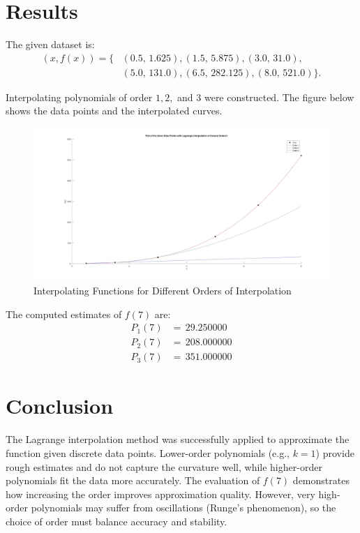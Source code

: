 \section*{Results}
The given dataset is:
\[
\begin{aligned}
(x, f(x)) = \{ &(0.5,\, 1.625), (1.5,\, 5.875), (3.0,\, 31.0), \\
               &(5.0,\, 131.0), (6.5,\, 282.125), (8.0,\, 521.0) \}.
\end{aligned}
\]

Interpolating polynomials of order $1, 2,$ and $3$ were constructed. The figure below shows the data points and the interpolated curves.

\begin{figure}[h!]
  \centering
  \includegraphics[width=1.0\textwidth]{a1.jpg}
  \caption{Interpolating Functions for Different Orders of Interpolation}
  \label{fig:a1}
\end{figure}

The computed estimates of $f(7)$ are:
\[
\begin{aligned}
  P_1(7) &= \, 29.250000 \\
  P_2(7) &= \, 208.000000 \\
  P_3(7) &= \, 351.000000
\end{aligned}
\]

\section*{Conclusion}
The Lagrange interpolation method was successfully applied to approximate the function given discrete data points. Lower-order polynomials (e.g., $k=1$) provide rough estimates and do not capture the curvature well, while higher-order polynomials fit the data more accurately. The evaluation of $f(7)$ demonstrates how increasing the order improves approximation quality. However, very high-order polynomials may suffer from oscillations (Runge’s phenomenon), so the choice of order must balance accuracy and stability.
